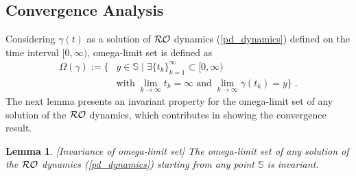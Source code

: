 \documentclass[journal,twoside,web]{ieeecolor}
\newtheorem{lemma}{Lemma}
\begin{document}
\subsection{Convergence Analysis}
Considering $\gamma(t)$ as a solution of ${\cal RO}$ dynamics (\ref{pd_dynamics}) defined on the time interval $[0,\infty)$, omega-limit set is defined as
\begin{align} \label{omega_limit}
\Omega(\gamma):=\{& y \in \mathbb S \;|\; \exists \{t_k\}_{k=1}^\infty \subset [0,\infty) \nonumber\\
&\text{with}\; \lim_{k \rightarrow \infty} t_k=\infty \;\text{and}\; \lim_{k \rightarrow \infty} \gamma(t_k)=y\}\;.
\end{align}
The next lemma presents an invariant property for the omega-limit set of any solution of the ${\cal RO}$ dynamics, which contributes in showing the convergence result.
\begin{lemma}\cite[Lemma~4.4]{cherukuri2016}[Invariance of omega-limit set]
The omega-limit set of any solution of the ${\cal RO}$ dynamics (\ref{pd_dynamics}) starting from any point $\mathbb S$ is invariant.
\label{omega_invariance}
\end{lemma}
\end{document}

